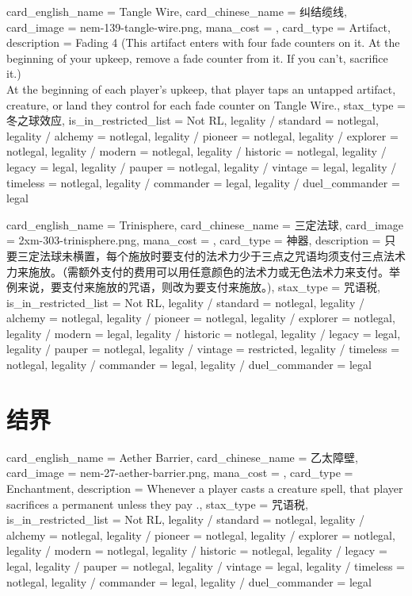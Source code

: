 \documentclass[lang = cn, color = black, 10pt]{AllThatStax}
\begin{document}
\card
{
	card_english_name = {Tangle Wire},
	card_chinese_name = {纠结缆线},
	card_image = nem-139-tangle-wire.png,
	mana_cost = ,
	card_type = Artifact,
	description = {Fading 4 (This artifact enters with four fade counters on it. At the beginning of your upkeep, remove a fade counter from it. If you can't, sacrifice it.)\\
		At the beginning of each player's upkeep, that player taps an untapped artifact, creature, or land they control for each fade counter on Tangle Wire.},
	stax_type = 冬之球效应,
	is_in_restricted_list = Not RL,
	legality / standard = notlegal,
	legality / alchemy = notlegal,
	legality / pioneer = notlegal,
	legality / explorer = notlegal,
	legality / modern = notlegal,
	legality / historic = notlegal,
	legality / legacy = legal,
	legality / pauper = notlegal,
	legality / vintage = legal,
	legality / timeless = notlegal,
	legality / commander = legal,
	legality / duel_commander = legal
}

\card
{
	card_english_name = {Trinisphere},
	card_chinese_name = {三定法球},
	card_image = 2xm-303-trinisphere.png,
	mana_cost = ,
	card_type = 神器,
	description = {只要三定法球未横置，每个施放时要支付的法术力少于三点之咒语均须支付三点法术力来施放。（需额外支付的费用可以用任意颜色的法术力或无色法术力来支付。举例来说，要支付来施放的咒语，则改为要支付来施放。)},
	stax_type = 咒语税,
	is_in_restricted_list = Not RL,
	legality / standard = notlegal,
	legality / alchemy = notlegal,
	legality / pioneer = notlegal,
	legality / explorer = notlegal,
	legality / modern = legal,
	legality / historic = notlegal,
	legality / legacy = legal,
	legality / pauper = notlegal,
	legality / vintage = restricted,
	legality / timeless = notlegal,
	legality / commander = legal,
	legality / duel_commander = legal
}

\section{结界}

\card
{
	card_english_name = {Aether Barrier},
	card_chinese_name = {乙太障壁},
	card_image = nem-27-aether-barrier.png,
	mana_cost = ,
	card_type = Enchantment,
	description = {Whenever a player casts a creature spell, that player sacrifices a permanent unless they pay .},
	stax_type = 咒语税,
	is_in_restricted_list = Not RL,
	legality / standard = notlegal,
	legality / alchemy = notlegal,
	legality / pioneer = notlegal,
	legality / explorer = notlegal,
	legality / modern = notlegal,
	legality / historic = notlegal,
	legality / legacy = legal,
	legality / pauper = notlegal,
	legality / vintage = legal,
	legality / timeless = notlegal,
	legality / commander = legal,
	legality / duel_commander = legal
}
\end{document}
